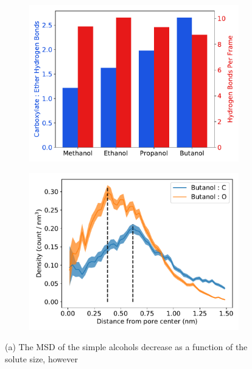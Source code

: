 \documentclass{article}
\begin{document}
\begin{figure}
\begin{subfigure}{0.45\textwidth}
  \includegraphics[width=\linewidth]{simple_alcohol_hbonds.pdf}
  \caption{}\label{fig:simple_alcohol_hbonds}
  \end{subfigure}
  \begin{subfigure}{0.45\textwidth}
  \includegraphics[width=\linewidth]{butanol_CO.pdf}
  \caption{}\label{fig:butanol_CO}
  \end{subfigure}
  \caption{(a) The MSD of the simple alcohols decrease as a function of the solute size, however
}
\end{figure}
\end{document}
